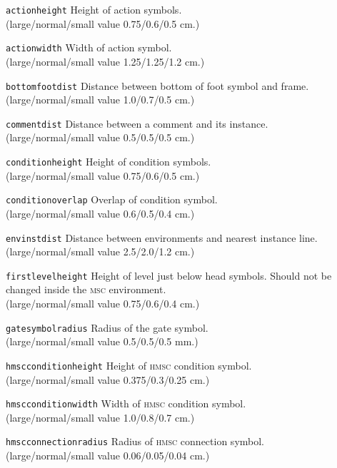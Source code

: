 \documentclass[a4paper]{article}
\newcommand{\cmd}[1]{\texttt{\bslash #1}}
\newcommand{\acro}[1]{{\scshape\lowercase{#1}}}
\newcommand\MSC{\acro{MSC}}
\newcommand\HMSC{\acro{HMSC}}
\newcommand{\lnsvalue}[3]{large/normal/small value #1/#2/#3}
\newenvironment{defs}{%
  \begin{list}{}%
              {\setlength{\labelwidth}{0pt}%
               \setlength{\labelsep}{1em}%
               \setlength{\leftmargin}{1em}%
               \setlength{\parsep}{1ex}%
               \setlength{\listparindent}{0pt}%
               \setlength{\rightmargin}{0pt}%
               \renewcommand{\makelabel}[1]{##1}%
               \raggedright%
              }%
  }{%
  \end{list}}
\begin{document}
\begin{defs}

\item[\cmd{actionheight}]
Height of action symbols.\\
(\lnsvalue{0.75}{0.6}{0.5} cm.)

\item[\cmd{actionwidth}]
Width of action symbol.\\
(\lnsvalue{1.25}{1.25}{1.2} cm.)

\item[\cmd{bottomfootdist}]
Distance between bottom of foot symbol and frame.\\
(\lnsvalue{1.0}{0.7}{0.5} cm.)

\item[\cmd{commentdist}]
Distance between a comment and its instance.\\
(\lnsvalue{0.5}{0.5}{0.5} cm.)

\item[\cmd{conditionheight}]
Height of condition symbols.\\
(\lnsvalue{0.75}{0.6}{0.5} cm.)

\item[\cmd{conditionoverlap}]
Overlap of condition symbol.\\
(\lnsvalue{0.6}{0.5}{0.4} cm.)

\item[\cmd{envinstdist}]
Distance between environments and nearest instance line.\\
(\lnsvalue{2.5}{2.0}{1.2} cm.)

\item[\cmd{firstlevelheight}] Height of level just below head
symbols. Should not be changed inside the \MSC{} environment.\\
(\lnsvalue{0.75}{0.6}{0.4} cm.)

\item[\cmd{gatesymbolradius}] Radius of the gate symbol.\\
(\lnsvalue{0.5}{0.5}{0.5} mm.)

\item[\cmd{hmscconditionheight}]
Height of \HMSC{} condition symbol.\\
(\lnsvalue{0.375}{0.3}{0.25} cm.)

\item[\cmd{hmscconditionwidth}]
Width of \HMSC{} condition symbol.\\
(\lnsvalue{1.0}{0.8}{0.7} cm.)

\item[\cmd{hmscconnectionradius}]
Radius of \HMSC{} connection symbol.\\
(\lnsvalue{0.06}{0.05}{0.04} cm.)


\end{defs}
\end{document}
